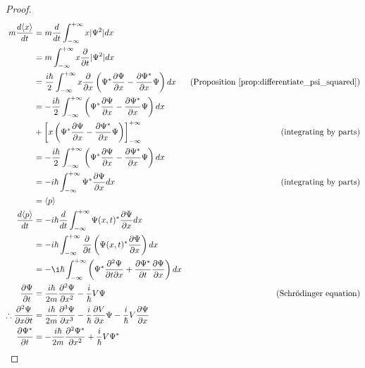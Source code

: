 \begin{proof}
\pf
\begin{align*}
m \frac{d \langle x \rangle}{dt} & = m \frac{d}{dt} \int_{- \infty}^{+ \infty} x |\Psi^2| dx \\
& = m \int_{-\infty}^{+ \infty} x \frac{\partial}{\partial t} |\Psi^2| dx \\
& = \frac{i \hbar}{2} \int_{-\infty}^{+ \infty} x \frac{\partial}{\partial x} \left( \Psi^* \frac{\partial \Psi}{\partial x} - \frac{\partial \Psi^*}{\partial x} \Psi \right) dx & (\text{Proposition \ref{prop:differentiate_psi_squared}}) \\
& = - \frac{i \hbar}{2} \int_{-\infty}^{+ \infty} \left( \Psi^* \frac{\partial \Psi}{\partial x} - \frac{\partial \Psi^*}{\partial x} \Psi \right) dx \\
& + \left[ x \left( \Psi^* \frac{\partial \Psi}{\partial x} - \frac{\partial \Psi^*}{\partial x} \Psi \right) \right]_{- \infty}^{+ \infty} & (\text{integrating by parts}) \\
& = - \frac{i \hbar}{2} \int_{-\infty}^{+ \infty} \left( \Psi^* \frac{\partial \Psi}{\partial x} - \frac{\partial \Psi^*}{\partial x} \Psi \right) dx \\
& = - i \hbar \int_{- \infty}^{+ \infty} \Psi^* \frac{\partial \Psi}{\partial x} dx & (\text{integrating by parts}) \\
& = \langle p \rangle \\
\frac{d \langle p \rangle}{dt} & = - i \hbar \frac{d}{dt} \int_{-\infty}^{+ \infty} \Psi(x,t)^* \frac{\partial \Psi}{\partial x} dx \\
& = - i \hbar \int_{-\infty}^{+ \infty} \frac{\partial}{\partial t} \left( \Psi(x,t)^* \frac{\partial \Psi}{\partial x} \right) dx \\
& = - \i \hbar \int_{- \infty}^{+ \infty} \left( \Psi^* \frac{\partial^2 \Psi}{\partial t \partial x} + \frac{\partial \Psi^*}{\partial t} \frac{\partial \Psi}{\partial x} \right) dx \\
\frac{\partial \Psi}{\partial t} & = \frac{i \hbar}{2m} \frac{\partial^2 \Psi}{\partial x^2} - \frac{i}{\hbar} V \Psi & (\text{Schr\"{o}dinger equation}) \\
\therefore \frac{\partial^2 \Psi}{\partial x \partial t} & = \frac{i \hbar}{2m} \frac{\partial^3 \Psi} {\partial x^3} - \frac{i}{\hbar} \frac{\partial V}{\partial x} \Psi - \frac{i}{\hbar} V \frac{\partial \Psi}{\partial x} \\
\frac{\partial \Psi^*}{\partial t} & = - \frac{i \hbar}{2m} \frac{\partial^2 \Psi^*}{\partial x^2} + \frac{i}{\hbar} V \Psi^* \\

\end{align*}
\end{proof}
